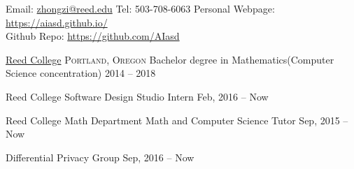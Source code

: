 \documentclass[10pt,a4paper]{article}
\begin{document}
\sloppy  %



\nobreakvspace{0.3em}  %

\noindent Email: \href{mailto:zhongzi@reed.edu}{zhongzi\mbox{}@\mbox{}reed.edu}\sbull
Tel: 503-708-6063\sbull
Personal Webpage: \href{https://aiasd.github.io/}{https://aiasd.github.io/} 
\\\sbull
Github Repo: \href{https://github.com/AIasd}{https://github.com/AIasd}
\\

\spacedhrule{0.9em}{-0.4em}  %


\headedsection
  {\href{http://www.reed.edu}{Reed College}}
  {\textsc{Portland, Oregon}} {%
  \headedsubsection
    {Bachelor degree in Mathematics(Computer Science concentration)}
    {2014 -- 2018}
    {}
}

\spacedhrule{-0.2em}{-0.4em}

 \headedsection
  {Reed College Software Design Studio} {%
  \headedsubsection
    {Intern}
    {Feb, 2016 -- Now}
    {}}
   
 \headedsection
  {Reed College Math Department} {%
  \headedsubsection
    {Math and Computer Science Tutor}
    {Sep, 2015 -- Now}
    {}}

\spacedhrule{-0.2em}{-0.4em}

  \headedsubsection
    {Differential Privacy Group}
    {Sep, 2016 -- Now}
    {}
\end{document}
